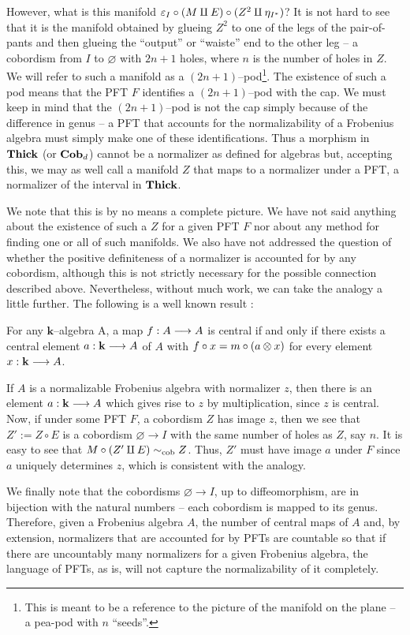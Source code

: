 However, what is this manifold
$\varepsilon_{I} \circ (M \amalg E) \circ (Z^2 \amalg \eta_{I^*})$? It is not hard to
see that it is the manifold obtained by glueing $Z^2$ to one of the legs of the
pair-of-pants and then glueing the ``output'' or ``waiste'' end to the other
leg -- a cobordism from $I$ to $\varnothing$ with $2n + 1$ holes, where $n$ is
the number of holes in $Z$. We will refer to such a manifold as a
$(2n + 1)$--pod\footnote{This is meant to be a reference to the picture of the
manifold on the plane -- a pea-pod with $n$ ``seeds''.}. The existence of such a
pod means that the PFT $F$ identifies a $(2n + 1)$--pod with the cap. We must
keep in mind that the $(2n + 1)$--pod is not the cap simply because of the
difference in genus -- a PFT that accounts for the normalizability of a
Frobenius algebra must simply make one of these identifications. Thus a morphism
in $\textbf{Thick}$ (or $\textbf{Cob}_d$) cannot be a normalizer as defined for algebras but,
accepting this, we may as well call a manifold $Z$ that maps to a normalizer
under a PFT, a normalizer of the interval in $\textbf{Thick}$.

We note that this is by no means a complete picture. We have not said anything
about the existence of such a $Z$ for a given PFT $F$ nor about any method for
finding one or all of such manifolds. We also have not addressed the question of
whether the positive definiteness of a normalizer is accounted for by any
cobordism, although this is not strictly necessary for the possible connection
described above. Nevertheless, without much work, we can take the analogy a
little further. The following is a well known result \cite[Def. 2.5]{channels}:

\begin{thm}
For any $\mathbf{k}$--algebra A, a map $f : A \stackrel{}{\longrightarrow} A$ is central if and only if
there exists a central element $a : \mathbf{k} \stackrel{}{\longrightarrow} A$ of $A$ with
$f \circ x = m \circ (a \otimes x)$ for every element $x : \mathbf{k} \stackrel{}{\longrightarrow} A$.
\end{thm}

If $A$ is a normalizable Frobenius algebra with normalizer $z$, then there is an
element $a : \mathbf{k} \stackrel{}{\longrightarrow} A$ which gives rise to $z$ by multiplication, since
$z$ is central. Now, if under some PFT $F$, a cobordism $Z$ has image $z$, then
we see that $Z' := Z \circ E$ is a cobordism $\varnothing \to I$ with the same
number of holes as $Z$, say $n$. It is easy to see that
$M \circ (Z' \amalg E) \sim_{\text{cob}} Z$. Thus, $Z'$ must have image $a$ under $F$ since
$a$ uniquely determines $z$, which is consistent with the analogy.

We finally note that the cobordisms $\varnothing \to I$, up to diffeomorphism,
are in bijection with the natural numbers -- each cobordism is mapped to its
genus. Therefore, given a Frobenius algebra $A$, the number of central maps of
$A$ and, by extension, normalizers that are accounted for by PFTs are countable
so that if there are uncountably many normalizers for a given Frobenius algebra,
the language of PFTs, as is, will not capture the normalizability of it
completely.

